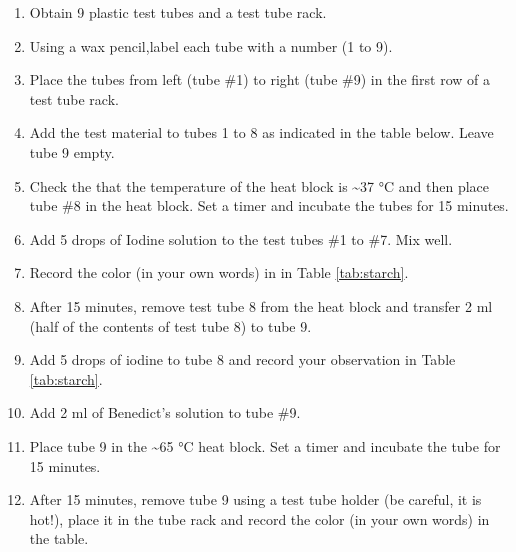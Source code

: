 \documentclass[]{book}
\providecommand{\tightlist}{%
  \setlength{\itemsep}{0pt}\setlength{\parskip}{0pt}}
\begin{document}
\begin{enumerate}
\def\labelenumi{\arabic{enumi}.}
\tightlist
\item
  Obtain 9 plastic test tubes and a test tube rack.
\item
  Using a wax pencil,label each tube with a number (1 to 9).
\item
  Place the tubes from left (tube \#1) to right (tube \#9) in the first row of a test tube rack.
\item
  Add the test material to tubes 1 to 8 as indicated in the table below. Leave tube 9 empty.
\item
  Check the that the temperature of the heat block is \textasciitilde{}37 °C and then place tube \#8 in the heat block. Set a timer and incubate the tubes for 15 minutes.
\item
  Add 5 drops of Iodine solution to the test tubes \#1 to \#7. Mix well.
\item
  Record the color (in your own words) in in Table \ref{tab:starch}.
\item
  After 15 minutes, remove test tube 8 from the heat block and transfer 2 ml (half of the contents of test tube 8) to tube 9.
\item
  Add 5 drops of iodine to tube 8 and record your observation in Table \ref{tab:starch}.
\item
  Add 2 ml of Benedict's solution to tube \#9.
\item
  Place tube 9 in the \textasciitilde{}65 °C heat block. Set a timer and incubate the tube for 15 minutes.
\item
  After 15 minutes, remove tube 9 using a test tube holder (be careful, it is hot!), place it in the tube rack and record the color (in your own words) in the table.
\end{enumerate}
\end{document}
